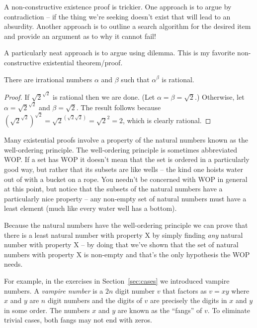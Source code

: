 A non-constructive existence proof is trickier.  One approach is to argue
by contradiction -- if the thing we're seeking doesn't exist that will
lead to an absurdity.  Another approach is to outline a search algorithm
for the desired item and provide an argument as to why it cannot fail!

A particularly neat approach is to argue using dilemma.
This is my favorite non-constructive existential theorem/proof.

\begin{thm}
There are irrational numbers $\alpha$ and $\beta$ such that $\alpha^\beta$
is rational.
\end{thm}

\begin{proof}
If $\sqrt{2}^{\sqrt{2}}$ is rational then we are done.
(Let $ \alpha = \beta = \sqrt{2}$.)  Otherwise, let 
$\alpha = \sqrt{2}^{\sqrt{2}}$ and $\beta = \sqrt{2}$.  The result
follows because $\left(\sqrt{2}^{\sqrt{2}}\right)^{\sqrt{2}} = \sqrt{2}^{(\sqrt{2}\sqrt{2})} 
= \sqrt{2}^2 = 2$, which is clearly rational.

\end{proof} 

Many existential proofs involve a property of the natural numbers
known as the well-ordering principle.  The well-ordering principle is 
sometimes abbreviated WOP.  If a set has WOP it doesn't mean that the 
set is ordered in a particularly good way, but rather that its subsets
are like wells -- the kind one hoists water out of with a bucket on a rope.
You needn't be concerned with WOP in general at this point, but notice
that the subsets of the natural numbers have a particularly nice property
 -- any non-empty set of natural numbers must have a least element (much like
every water well has a bottom).

Because the natural numbers have the well-ordering principle 
we can prove that there is a least 
natural number with property X by simply finding \emph{any} natural
number with property X -- by doing that we've shown that the set of
natural numbers with property X is non-empty and that's the only
hypothesis the WOP needs.  

For example, in the exercises in Section~\ref{sec:cases} we 
introduced vampire numbers. A  \emph{vampire number} 
is a 
$2n$ digit number $v$ that factors as $v=xy$
where $x$ and $y$ are $n$ digit numbers and the digits of $v$ are precisely the digits in $x$ and $y$ in some order.  The numbers $x$ and $y$
are known as the ``fangs'' of $v$.  To eliminate trivial
cases, both fangs may not end with zeros.  


